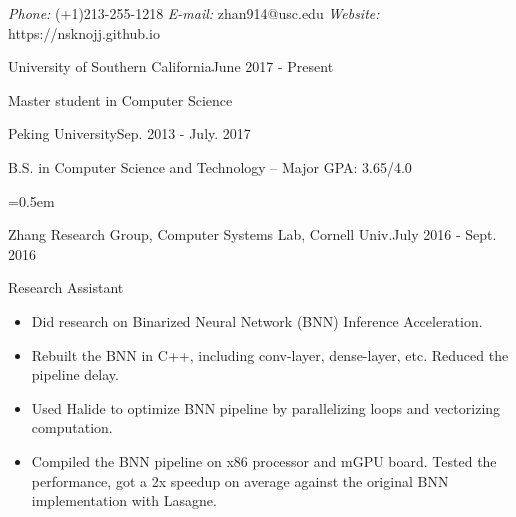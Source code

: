 \documentclass{joel_cv}
\begin{document}
	\pagestyle{empty}
	
	\begin{cvHeader} 
		\textit{Phone:} (+1)213-255-1218 \quad \textit{E-mail:} zhan914@usc.edu
		\quad \textit{Website:} https://nsknojj.github.io
	\end{cvHeader}
	
	
	\begin{sectionContentSimple}{University of Southern California}{June 2017 - Present}
	\vspace{-0.2em}
		\item Master student in Computer Science %
	\end{sectionContentSimple}
	\vspace{-0.3em}
	\begin{sectionContentSimple}{Peking University}{Sep. 2013 - July. 2017}
	\vspace{-0.2em}
		\item B.S. in Computer Science and Technology  \quad -- Major GPA: 3.65/4.0
	\end{sectionContentSimple}
	
	
	\parskip=0.5em
	\begin{sectionContentSimple}{Zhang Research Group, Computer Systems Lab, Cornell Univ.}{July 2016 - Sept. 2016}
		\item Research Assistant
		\vspace{-0.5em}
		\begin{itemize}
			\itemsep=-0.6em
			\item Did research on Binarized Neural Network (BNN) Inference Acceleration.
			\item Rebuilt the BNN in C++, including conv-layer, dense-layer, etc. Reduced the pipeline delay.
			\item Used Halide to optimize BNN pipeline by parallelizing loops and vectorizing computation.
			\item Compiled the BNN pipeline on x86 processor and mGPU board. Tested the performance, got a 2x speedup on average against the original BNN implementation with Lasagne.
		\end{itemize}
	\end{sectionContentSimple}
	\vspace{-0.2em}
	
\end{document}
